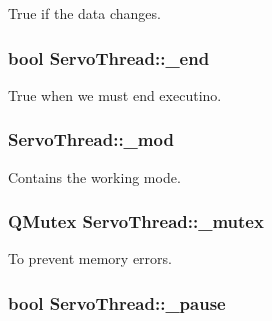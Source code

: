 True if the data changes. 

\hypertarget{class_servo_thread_acca9896d1a2d1ef68527e6834f81c76c}{}
\subsubsection[{\+\_\+end}]{\setlength{\rightskip}{0pt plus 5cm}bool Servo\+Thread\+::\+\_\+end\hspace{0.3cm}{\ttfamily [private]}}\label{class_servo_thread_acca9896d1a2d1ef68527e6834f81c76c}


True when we must end executino. 

\hypertarget{class_servo_thread_acdecea1688594d3ab7386a6db97dd90d}{}
\subsubsection[{\+\_\+mod}]{ Servo\+Thread\+::\+\_\+mod\hspace{0.3cm}{\ttfamily [private]}}\label{class_servo_thread_acdecea1688594d3ab7386a6db97dd90d}


Contains the working mode. 

\hypertarget{class_servo_thread_a6327eafc0dac189ec1b202d63ef32457}{}
\subsubsection[{\+\_\+mutex}]{\setlength{\rightskip}{0pt plus 5cm}Q\+Mutex Servo\+Thread\+::\+\_\+mutex\hspace{0.3cm}{\ttfamily [private]}}\label{class_servo_thread_a6327eafc0dac189ec1b202d63ef32457}


To prevent memory errors. 

\hypertarget{class_servo_thread_aaf2ef80e8e43518b75d20a5102970d2e}{}
\subsubsection[{\+\_\+pause}]{\setlength{\rightskip}{0pt plus 5cm}bool Servo\+Thread\+::\+\_\+pause\hspace{0.3cm}{\ttfamily [private]}}\label{class_servo_thread_aaf2ef80e8e43518b75d20a5102970d2e}


